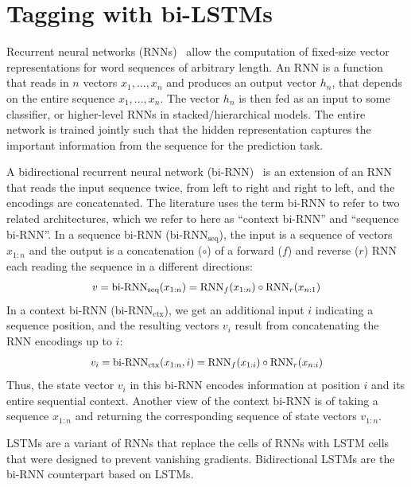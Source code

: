\documentclass[11pt]{article}
\begin{document}
\section{Tagging with bi-LSTMs}

Recurrent neural networks (RNNs)~\cite{elman:1990} allow the computation of fixed-size vector representations for word sequences of arbitrary length.  
An RNN is a function that reads in $n$ vectors $x_1,...,x_n$ and produces an output vector $h_n$, that depends on the entire sequence $x_1,...,x_n$. 
The vector $h_n$ is then fed as an input to some classifier, or higher-level RNNs in stacked/hierarchical models.
The entire network is trained jointly such that the hidden representation captures the important information from the sequence for the prediction task.

A bidirectional recurrent neural network (bi-RNN)~\cite{graves:schmidhuber:2005} is an extension of an RNN that reads the input sequence twice, 
from left to right and right to left, and the encodings are concatenated. 
The literature uses the term bi-RNN to refer to two related architectures, which we refer to here as ``context bi-RNN'' and ``sequence bi-RNN''.
In a sequence bi-RNN (bi-RNN$_{\text{seq}}$), the input is a sequence of vectors $x_{1:n}$ and the output is a concatenation ($\circ$) of a forward ($f$) and reverse ($r$) 
RNN each reading the sequence in a different directions:
\[ \scalebox{.95}{$ v = \text{bi-RNN}_\text{seq}(x_{1:n}) = \text{RNN}_f(x_{1:n}) \circ \text{RNN}_r(x_{n:1}) $} \]
In a context bi-RNN (bi-RNN$_{\text{ctx}}$), we get an additional input $i$ indicating a sequence position, and the resulting vectors $v_i$ result from concatenating the RNN encodings up to $i$: 
\[ \scalebox{.93}{$ v_i = \text{bi-RNN}_\text{ctx}(x_{1:n},i) = \text{RNN}_f(x_{1:i}) \circ \text{RNN}_r(x_{n:i}) $} \]
Thus, the state vector $v_i$ in this bi-RNN encodes information 
at position $i$ and its entire sequential context.
Another view of the context bi-RNN is of taking a sequence $x_{1:n}$ and returning the corresponding sequence of state vectors $v_{1:n}$.


LSTMs \cite{Hochreiter:Schmidhuber:97} are a variant of RNNs that replace the cells of RNNs
with LSTM cells that were designed to prevent vanishing gradients. 
Bidirectional LSTMs are the bi-RNN counterpart based on LSTMs.
\end{document}
